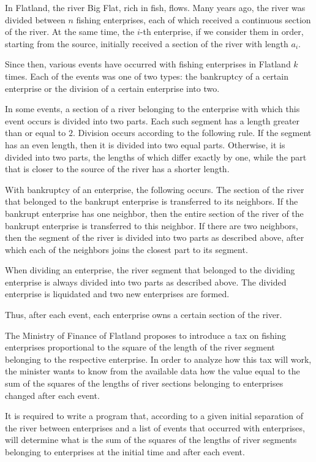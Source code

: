 \documentclass[a4paper]{article}
\begin{document}
In Flatland, the river Big Flat, rich in fish, flows. Many years ago, the river was divided between $n$ fishing enterprises, each of which received a continuous section of the river. At the same time, the $i$-th enterprise, if we consider them in order, starting from the source, initially received a section of the river with length $a_i$.

Since then, various events have occurred with fishing enterprises in Flatland $k$ times. Each of the events was one of two types: the bankruptcy of a certain enterprise or the division of a certain enterprise into two.

In some events, a section of a river belonging to the enterprise with which this event occurs is divided into two parts. Each such segment has a length greater than or equal to $2$. Division occurs according to the following rule. If the segment has an even length, then it is divided into two equal parts. Otherwise, it is divided into two parts, the lengths of which differ exactly by one, while the part that is closer to the source of the river has a shorter length.

With bankruptcy of an enterprise, the following occurs. The section of the river that belonged to the bankrupt enterprise is transferred to its neighbors. If the bankrupt enterprise has one neighbor, then the entire section of the river of the bankrupt enterprise is transferred to this neighbor. If there are two neighbors, then the segment of the river is divided into two parts as described above, after which each of the neighbors joins the closest part to its segment.

When dividing an enterprise, the river segment that belonged to the dividing enterprise is always divided into two parts as described above. The divided enterprise is liquidated and two new enterprises are formed.

Thus, after each event, each enterprise owns a certain section of the river.

The Ministry of Finance of Flatland proposes to introduce a tax on fishing enterprises proportional to the square of the length of the river segment belonging to the respective enterprise. In order to analyze how this tax will work, the minister wants to know from the available data how the value equal to the sum of the squares of the lengths of river sections belonging to enterprises changed after each event.

It is required to write a program that, according to a given initial separation of the river between enterprises and a list of events that occurred with enterprises, will determine what is the sum of the squares of the lengths of river segments belonging to enterprises at the initial time and after each event.
\end{document}
